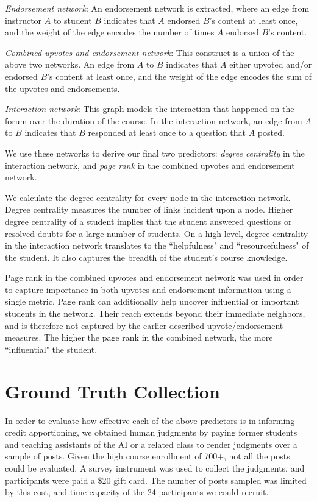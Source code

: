 \emph{Endorsement network}: An endorsement network is extracted, where
an edge from instructor $A$ to student $B$ indicates that $A$ endorsed
$B$'s content at least once, and the weight of the edge encodes the
number of times $A$ endorsed $B$'s content.

\emph{Combined upvotes and endorsement network}: This construct is a union of
the above two networks. An edge from $A$ to $B$ indicates that $A$
either upvoted and/or endorsed $B$'s content at least once, and the
weight of the edge encodes the sum of the upvotes and endorsements.

\emph{Interaction network}: This graph models the interaction that
happened on the forum over the duration of the course. In the
interaction network, an edge from $A$ to $B$ indicates that $B$
responded at least once to a question that $A$ posted.

We use these networks to derive our final two predictors: \emph{degree
  centrality} in the interaction network, and \emph{page rank} in the combined upvotes and endorsement network.

We calculate the degree centrality for every node in the interaction
network. Degree centrality measures the number of links incident upon
a node. Higher degree centrality of a student implies that the student
answered questions or resolved doubts for a large number of
students. On a high level, degree centrality in the interaction
network translates to the ``helpfulness" and ``resourcefulness" of the student. It also captures the breadth of the student's course knowledge.

Page rank in the combined upvotes and endorsement network was used in
order to capture importance in both upvotes and endorsement
information using a single metric. Page rank can additionally help
uncover influential or important students in the network. Their reach
extends beyond their immediate neighbors, and is therefore not
captured by the earlier described upvote/endorsement measures. The
higher the page rank in the combined network, the more ``influential" the
student.

\section{Ground Truth Collection}

In order to evaluate how effective each of the above predictors is in
informing credit apportioning, we obtained human judgments by paying former students and teaching
assistants of the AI or a related class to render judgments over a
sample of posts. Given the high course enrollment of 700+, not all the
posts could be evaluated. A survey instrument was used to collect the
judgments, and participants were paid a \$20 gift card. The number of
posts sampled was limited by this cost, and time capacity of the 24
participants we could recruit.

